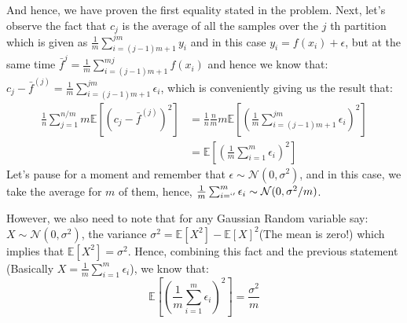 \documentclass[]{article}
\begin{document}
        And hence, we have proven the first equality stated in the problem. Next, let's observe the fact that $c_j$ is the average of all the samples over the $j$ th partition which is given as $\frac{1}{m}\sum_{i = (j - 1)m + 1}^{jm}y_i$ and in this case $y_i = f(x_i) + \epsilon$, but at the same time $\bar{f}^{j} = \frac{1}{m}\sum_{i = (j - 1)m + 1}^{mj}f(x_i)$ and hence we know that: $c_j - \bar{f}^{(j)} = \frac{1}{m}\sum_{i = (j - 1)m + 1}^{jm}\epsilon_i$, which is conveniently giving us the result that: 
        \begin{align*}\tag{B.1.c.3}\label{eqn:B.1.c.3}
            \frac{1}{n}\sum_{j = 1}^{n/m}
            m\mathbb{E}\left[
                (c_j - \bar{f}^{(j)})^2
            \right]
            &=
            \frac{1}{n}\frac{n}{m}m \mathbb{E}\left[
                \left(
                    \frac{1}{m}\sum_{i = (j - 1)m + 1}^{jm}\epsilon_i
                \right)^2
            \right]
            \\
            &= \mathbb{E}\left[
                \left(
                    \frac{1}{m}\sum_{i = 1}^{m}\epsilon_i
                \right)^2
            \right]
        \end{align*}
        Let's pause for a moment and remember that $\epsilon \sim \mathcal{N}(0, \sigma^2)$, and in this case, we take the average for $m$ of them, hence, $\frac{1}{m}\sum_{i = `'}^{m}\epsilon_i\sim \mathcal{N}(0, \sigma^2/m)$. 
        \par
        However, we also need to note that for any Gaussian Random variable say: $X\sim \mathcal{N}(0, \sigma^2)$, the variance $\sigma^2 = \mathbb{E}\left[X^2\right] - \mathbb{E}\left[X\right]^2$(The mean is zero!) which implies that $\mathbb{E}\left[X^2\right] = \sigma^2$. Hence, combining this fact and the previous statement (Basically $X = \frac{1}{m}\sum_{i = 1}^{m}\epsilon_i$), we know that: 
        \begin{equation*}\tag{B.1.c.4}\label{eqn:B.1.c.4}
            \mathbb{E}\left[
                \left(
                    \frac{1}{m}\sum_{i = 1}^{m}\epsilon_i
                \right)^2
            \right] = \frac{\sigma^2}{m}
        \end{equation*}
\end{document}
